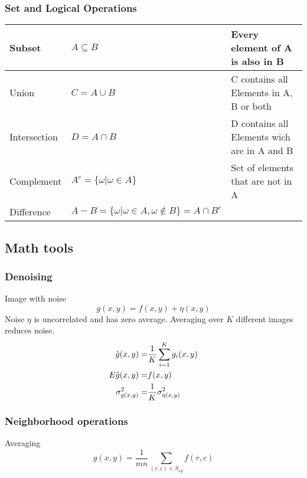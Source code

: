 \subsubsection{Set and Logical Operations }
\begin{tabular}{|l|l|l|}
	\hline
	Subset			& $A \subseteq B$						& Every element of A is also in B
	\\ \hline
	Union			& $C = A \cup B$						& C contains all Elements in A, B or both
	\\ \hline
	Intersection	& $D = A \cap B$						& D contains all Elements wich are in A and B
	\\ \hline
	Complement		& $A^c = \{ \omega | \omega \in A\}$	& Set of elements that are not in A
	\\ \hline
	Difference		& $A-B = \{ \omega | \omega \in A, \omega \notin B\} = A \cap B^c$	&
	\\ \hline
\end{tabular}


\subsection{Math tools}
\subsubsection{Denoising}
Image with noise
\begin{equation}
g(x,y) = f(x,y) + \eta(x,y)
\end{equation}
Noise $\eta$ is uncorrelated and has zero average.  Averaging over $K$ different images reduces noise.
\begin{eqnarray}
\hat{g}(x,y)      =& \frac{1}{K} \sum_{i=1}^{K}g_i(x,y) \notag \\
E{\hat{g}(x,y)}   =& f(x,y) \\
\sigma_{g(x,y)}^2 =& \frac{1}{K} \sigma_{\eta(x,y)}^2 \notag
\end{eqnarray}

\subsubsection{Neighborhood operations}
Averaging
\begin{equation}
g(x,y) = \frac{1}{mn} \sum_{(r,c)\in S_{xy}}f(r,c)
\end{equation}

